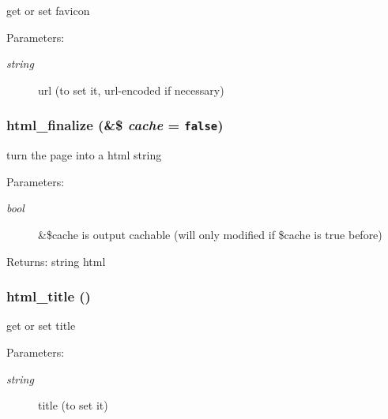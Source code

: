 get or set favicon

\begin{Desc}
\item[Parameters:]
\begin{description}
\item[{\em string}]url (to set it, url-encoded if necessary) \end{description}
\end{Desc}
\hypertarget{html_8inc_8php_405dc7e3718d4196c05087057ebf69bf}{
\subsubsection[{html\_\-finalize}]{\setlength{\rightskip}{0pt plus 5cm}html\_\-finalize (\&\$ {\em cache} = {\tt false})}}
\label{html_8inc_8php_405dc7e3718d4196c05087057ebf69bf}


turn the page into a html string

\begin{Desc}
\item[Parameters:]
\begin{description}
\item[{\em bool}]\&\$cache is output cachable (will only modified if \$cache is true before) \end{description}
\end{Desc}
\begin{Desc}
\item[Returns:]string html \end{Desc}
\hypertarget{html_8inc_8php_3f572f51a815fe19c590fea7d6d3a1a6}{
\subsubsection[{html\_\-title}]{\setlength{\rightskip}{0pt plus 5cm}html\_\-title ()}}
\label{html_8inc_8php_3f572f51a815fe19c590fea7d6d3a1a6}


get or set title

\begin{Desc}
\item[Parameters:]
\begin{description}
\item[{\em string}]title (to set it) \end{description}
\end{Desc}



